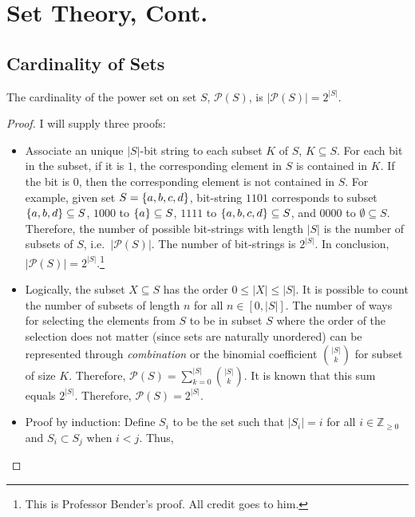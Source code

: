 
\section{Set Theory, Cont.}

\subsection{Cardinality of Sets}

\begin{proposition}
    The cardinality of the power set on set \(S\), \(\mathcal{P}(S)\), is \(|\mathcal{P}(S)|=2^{|S|}\).
\end{proposition}
\begin{proof}
    I will supply three proofs:
    \begin{itemize}
        \item Associate an unique \(|S|\)-bit string to each subset \(K\) of \(S\), \(K\subseteq S\). For each bit in the subset, if it is \(1\), the corresponding element in
        \(S\) is contained in \(K\). If the bit is \(0\), then the corresponding element is not contained in \(S\). For example, given set \(S=\{a,b,c,d\}\), bit-string \(1101\)
        corresponds to subset \(\{a,b,d\}\subseteq S\), \(1000\) to \(\{a\}\subseteq S\), \(1111\) to \(\{a,b,c,d\}\subseteq S\), and \(0000\) to \(\emptyset\subseteq S\).
        Therefore, the number of possible bit-strings with length \(|S|\) is the number of subsets of \(S\), i.e.\ \(|\mathcal{P}(S)|\). The number of bit-strings is \(2^{|S|}\).
        In conclusion, \(|\mathcal{P}(S)|=2^{|S|}\).\footnote{This is Professor Bender's proof. All credit goes to him.}
        \item Logically, the subset \(X\subseteq S\) has the order \(0\le|X|\le|S|\). It is possible to count the number of subsets of length \(n\) for all \(n\in[0,|S|]\).
        The number of ways for selecting the elements from \(S\) to be in subset \(S\) where the order of the selection does not matter (since sets are naturally unordered) 
        can be represented through \emph{combination} or the binomial coefficient \(\binom{|S|}{k}\) for subset of size \(K\). Therefore, 
        \(\mathcal{P}(S)=\sum_{k=0}^{|S|}\binom{|S|}{k}\). It is known that this sum equals \(2^{|S|}\). Therefore, \(\mathcal{P}(S)=2^{|S|}\).
        \item Proof by induction: Define \(S_i\) to be the set such that \(|S_i|=i\) for all \(i\in\mathbb{Z}_{\ge0}\) and \(S_i\subset S_j\) when \(i<j\). Thus, 

\end{itemize}
\end{proof}
